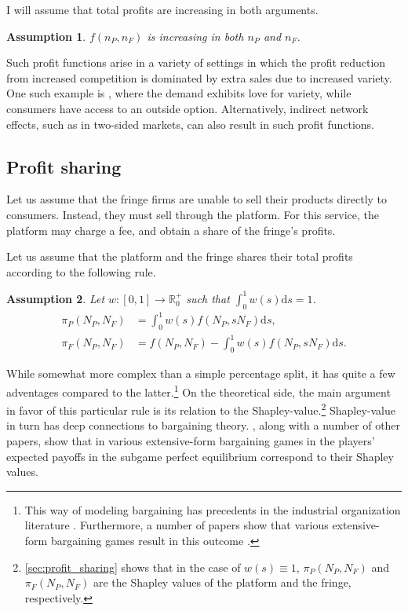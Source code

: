 \documentclass[a4paper]{article}
\newtheorem{assumption}{Assumption}
\newcommand{\ds}{\mathrm{d}s}
\begin{document}
I will assume that total profits are increasing in both arguments.
\begin{assumption}
    \label{ass:monotone_profits}
    $f(n_P, n_F)$ is increasing in both $n_P$ and $n_F$.
\end{assumption}
Such profit functions arise in a variety of settings in which the profit reduction from increased competition is dominated by extra sales due to increased variety.
One such example is \textcite{anderson2020aggregative}, where the demand exhibits love for variety, while consumers have access to an outside option.
Alternatively, indirect network effects, such as in two-sided markets, can also result in such profit functions.


\subsection{Profit sharing}

Let us assume that the fringe firms are unable to sell their products directly to consumers.
Instead, they must sell through the platform.
For this service, the platform may charge a fee, and obtain a share of the fringe's profits.

Let us assume that the platform and the fringe shares their total profits according to the following rule.
\begin{assumption}
    \label{ass:profit_sharing}
    Let $w: [0, 1] \to \mathbb{R}_0^+$ such that $\int_0^1 w(s) \ds = 1$. 
    \begin{align*}
        \pi_P(N_P, N_F) &= \int_0^1 w(s) f(N_P, s N_F) \ds, \\
        \pi_F(N_P, N_F) &= f(N_P, N_F) - \int_0^1 w(s) f(N_P, s N_F) \ds.
    \end{align*}
\end{assumption}
While somewhat more complex than a simple percentage split, it has quite a few adventages compared to the latter.\footnote{
    This way of modeling bargaining has precedents in the industrial organization literature \parencite[e.g.][]{hart1990property,segal2003collusion,inderst2003bargaining,montez2007downstream}.
    Furthermore, a number of papers show that various extensive-form bargaining games result in this outcome \parencite{gul1989bargaining,winter1994demand,hart1996bargaining,inderst2003bargaining,stole1996intra}.
}
On the theoretical side, the main argument in favor of this particular rule is its relation to the Shapley-value.\footnote{
    \cref{sec:profit_sharing} shows that in the case of $w(s) \equiv 1$, $\pi_P(N_P, N_F)$ and $\pi_F(N_P, N_F)$ are the Shapley values of the platform and the fringe, respectively.
}
Shapley-value in turn has deep connections to bargaining theory.
\textcite{gul1989bargaining,stole1996intra,hart1996bargaining,inderst2003bargaining}, along with a number of other papers, show that in various extensive-form bargaining games in the players' expected payoffs in the subgame perfect equilibrium correspond to their Shapley values.
\end{document}
